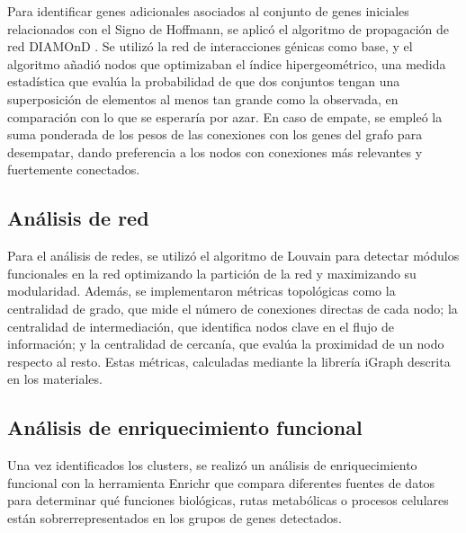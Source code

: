 Para identificar genes adicionales asociados al conjunto de genes iniciales relacionados con el Signo de Hoffmann, se aplicó el algoritmo de propagación de red DIAMOnD \cite{Ghiassian2015}. Se utilizó la red de interacciones génicas como base, y el algoritmo añadió nodos que optimizaban el índice hipergeométrico, una medida estadística que evalúa la probabilidad de que dos conjuntos tengan una superposición de elementos al menos tan grande como la observada, en comparación con lo que se esperaría por azar. En caso de empate, se empleó la suma ponderada de los pesos de las conexiones con los genes del grafo para desempatar, dando preferencia a los nodos con conexiones más relevantes y fuertemente conectados.


\subsection{Análisis de red}

Para el análisis de redes, se utilizó el algoritmo de Louvain \cite{Blondel2008} para detectar módulos funcionales en la red optimizando la partición de la red y maximizando su modularidad. Además, se implementaron métricas topológicas como la centralidad de grado, que mide el número de conexiones directas de cada nodo; la centralidad de intermediación, que identifica nodos clave en el flujo de información; y la centralidad de cercanía, que evalúa la proximidad de un nodo respecto al resto. Estas métricas, calculadas mediante la librería iGraph descrita en los materiales.

\subsection{Análisis de enriquecimiento funcional}

Una vez identificados los clusters, se realizó un análisis de enriquecimiento funcional con la herramienta Enrichr \cite{10.1093/nar/gkad393/1} que compara diferentes fuentes de datos para determinar qué funciones biológicas, rutas metabólicas o procesos celulares están sobrerrepresentados en los grupos de genes detectados.
